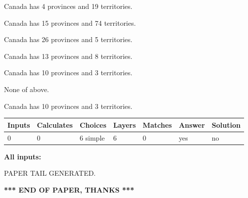 \documentclass[12pt]{article}
\begin{document}
 
Canada has   4 provinces and  19 territories.
 
 
Canada has  15 provinces and  74 territories.
 
 
Canada has  26 provinces and  5 territories.
 
 
Canada has  13 provinces and  8 territories.
 
 
Canada has 10  provinces and 3 territories.
 
 
 None of above.
 
 
\noindent{}
 
 
Canada has 10  provinces and 3 territories.
 
 
\noindent{}
 
 
   
   
   
   
\noindent\begin{tabular}{|l|l|l|l|l|l|l|}
 \hline
Inputs & Calculates & Choices & Layers & Matches & Answer & Solution \\ \hline
 0  & 
 0  & 
 6
  simple  
  & 
 6  & 
 0  & 
  yes & 
  no 
  \\ \hline
 \end{tabular}
   
   
   
   
\noindent{}
   
   
   
   
\noindent\vspace{0.1in}\hspace{-0.08in} {\textbf{\Large{All inputs: }}}
   
   
   
   
   
   
 \vspace{0.2in}
 
   
   
\vspace{2.0in} PAPER TAIL GENERATED.
   
   
   
   
\vspace{1.0in} 
{\textbf{\large{ *** END OF PAPER, THANKS *** }}} 
   
\end{document}
